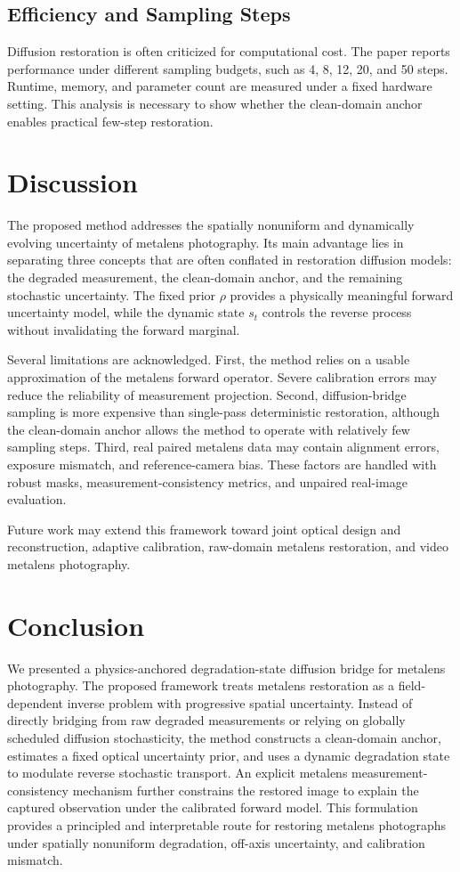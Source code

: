 \documentclass[journal]{IEEEtran}
\begin{document}
\subsection{Efficiency and Sampling Steps}
Diffusion restoration is often criticized for computational cost. The paper reports performance under different sampling budgets, such as 4, 8, 12, 20, and 50 steps. Runtime, memory, and parameter count are measured under a fixed hardware setting. This analysis is necessary to show whether the clean-domain anchor enables practical few-step restoration.

\section{Discussion}
The proposed method addresses the spatially nonuniform and dynamically evolving uncertainty of metalens photography. Its main advantage lies in separating three concepts that are often conflated in restoration diffusion models: the degraded measurement, the clean-domain anchor, and the remaining stochastic uncertainty. The fixed prior $\rho$ provides a physically meaningful forward uncertainty model, while the dynamic state $s_t$ controls the reverse process without invalidating the forward marginal.

Several limitations are acknowledged. First, the method relies on a usable approximation of the metalens forward operator. Severe calibration errors may reduce the reliability of measurement projection. Second, diffusion-bridge sampling is more expensive than single-pass deterministic restoration, although the clean-domain anchor allows the method to operate with relatively few sampling steps. Third, real paired metalens data may contain alignment errors, exposure mismatch, and reference-camera bias. These factors are handled with robust masks, measurement-consistency metrics, and unpaired real-image evaluation.

Future work may extend this framework toward joint optical design and reconstruction, adaptive calibration, raw-domain metalens restoration, and video metalens photography.

\section{Conclusion}
We presented a physics-anchored degradation-state diffusion bridge for metalens photography. The proposed framework treats metalens restoration as a field-dependent inverse problem with progressive spatial uncertainty. Instead of directly bridging from raw degraded measurements or relying on globally scheduled diffusion stochasticity, the method constructs a clean-domain anchor, estimates a fixed optical uncertainty prior, and uses a dynamic degradation state to modulate reverse stochastic transport. An explicit metalens measurement-consistency mechanism further constrains the restored image to explain the captured observation under the calibrated forward model. This formulation provides a principled and interpretable route for restoring metalens photographs under spatially nonuniform degradation, off-axis uncertainty, and calibration mismatch.
\end{document}

